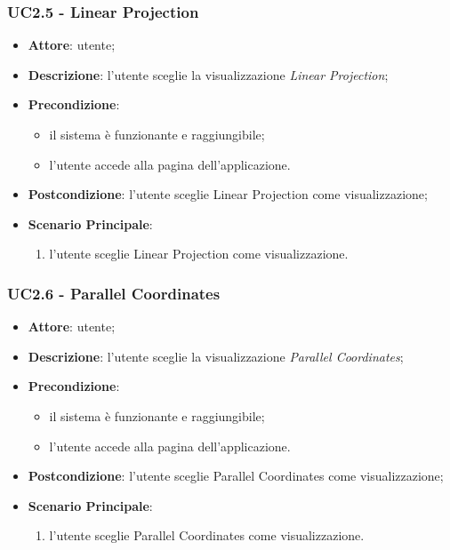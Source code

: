     \subsubsection{UC2.5 - Linear Projection}
    \label{uc2.5}
    
    \begin{itemize}
    \item \textbf{Attore}: utente;
    \item \textbf{Descrizione}: l'utente sceglie la visualizzazione \emph{Linear Projection};
    \item \textbf{Precondizione}:
    \begin{itemize}
        \item il sistema è funzionante e raggiungibile;
        \item l'utente accede alla pagina dell'applicazione.
    \end{itemize}
    \item \textbf{Postcondizione}: l'utente sceglie Linear Projection come visualizzazione;
    \item \textbf{Scenario Principale}: 
        \begin{enumerate}
            \item l'utente sceglie Linear Projection come visualizzazione.
        \end{enumerate}
    \end{itemize}
    
    \subsubsection{UC2.6 - Parallel Coordinates}
    \label{uc2.6}
    
    \begin{itemize}
    \item \textbf{Attore}: utente;
    \item \textbf{Descrizione}: l'utente sceglie la visualizzazione \emph{Parallel Coordinates};
    \item \textbf{Precondizione}:
    \begin{itemize}
        \item il sistema è funzionante e raggiungibile;
        \item l'utente accede alla pagina dell'applicazione.
    \end{itemize}
    \item \textbf{Postcondizione}: l'utente sceglie Parallel Coordinates come visualizzazione;
    \item \textbf{Scenario Principale}: 
        \begin{enumerate}
            \item l'utente sceglie Parallel Coordinates come visualizzazione.
        \end{enumerate}
    \end{itemize}
    
  
